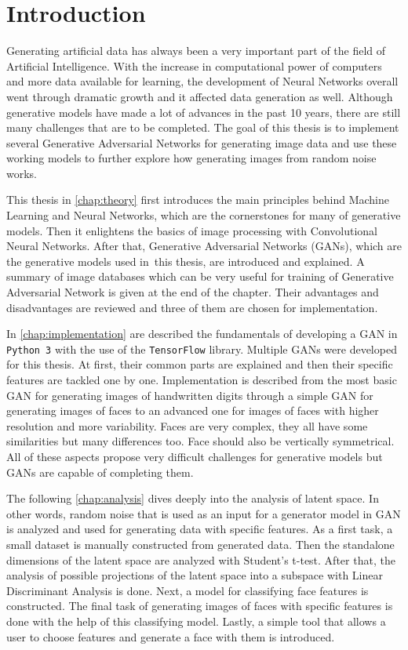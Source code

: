 \chapter{Introduction}
Generating artificial data has always been a very important part of the field of Artificial Intelligence. With the increase in computational power of computers and more data available for learning, the development of Neural Networks overall went through dramatic growth and it affected data generation as well. Although generative models have made a lot of advances in the past 10 years, there are still many challenges that are to be completed. The goal of this thesis is to implement several Generative Adversarial Networks for generating image data and use these working models to further explore how generating images from random noise works.

This thesis in \autoref{chap:theory} first introduces the main principles behind Machine Learning and Neural Networks, which are the cornerstones for many of generative models. Then it enlightens the basics of image processing with Convolutional Neural Networks. After that, Generative Adversarial Networks (GANs), which are the generative models used in~this thesis, are introduced and explained. A summary of image databases which can be very useful for training of Generative Adversarial Network is given at the end of the chapter. Their advantages and disadvantages are reviewed and three of them are chosen for implementation.

In \autoref{chap:implementation} are described the fundamentals of developing a GAN in \texttt{Python 3} with the use of the \texttt{TensorFlow} library. Multiple GANs were developed for this thesis. At first, their common parts are explained and then their specific features are tackled one by one. Implementation is described from the most basic GAN for generating images of handwritten digits through a simple GAN for generating images of faces to an advanced one for images of faces with higher resolution and more variability. Faces are very complex, they all have some similarities but many differences too. Face should also be vertically symmetrical. All of these aspects propose very difficult challenges for generative models but GANs are capable of completing them.

The following \autoref{chap:analysis} dives deeply into the analysis of latent space. In other words, random noise that is used as an input for a generator model in GAN is analyzed and used for generating data with specific features. As a first task, a small dataset is manually constructed from generated data. Then the standalone dimensions of the latent space are analyzed with Student's t-test. After that, the analysis of possible projections of the latent space into a subspace with Linear Discriminant Analysis is done. Next, a model for classifying face features is constructed. The final task of generating images of faces with specific features is done with the help of this classifying model. Lastly, a simple tool that allows a user to choose features and generate a face with them is introduced.

